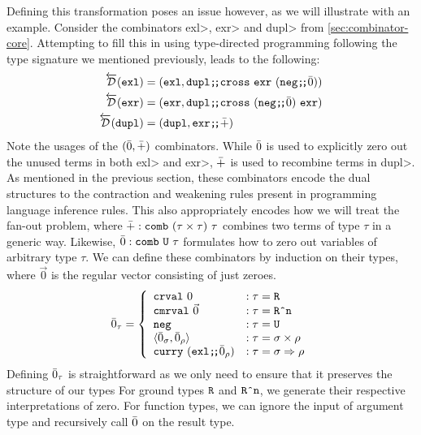   Defining this transformation poses an issue however, as we will illustrate with an example.
  Consider the combinators \<exl>, \<exr> and \<dupl> from \cref{sec:combinator-core}.
  Attempting to fill this in using type-directed programming following the type signature we mentioned previously, leads to the following:
  \begin{align*}
    \overleftarrow{\mathcal{D}}(\texttt{exl}) &= (\texttt{exl}, \texttt{dupl} \texttt{;\!;} \texttt{cross}\ \texttt{exr}\ (\texttt{neg} \texttt{;\!;} \bar{0})) \\
    \overleftarrow{\mathcal{D}}(\texttt{exr}) &= (\texttt{exr}, \texttt{dupl} \texttt{;\!;} \texttt{cross}\ (\texttt{neg} \texttt{;\!;} \bar{0})\ \texttt{exr}) \\
    \overleftarrow{\mathcal{D}}(\texttt{dupl}) &= (\texttt{dupl}, \texttt{exr} \texttt{;\!;} \bar{+})
  \end{align*}
  Note the usages of the $(\bar{0}, \bar{+})$ combinators.
  While $\bar{0}$ is used to explicitly zero out the unused terms in both \<exl> and \<exr>, $\bar{+}$ is used to recombine terms in \<dupl>.
  As mentioned in the previous section, these combinators encode the dual structures to the contraction and weakening rules present in programming language inference rules.
  This also appropriately encodes how we will treat the fan-out problem, where $\bar{+} : \texttt{comb}\ (\tau \times \tau)\ \tau$ combines two terms of type $\tau$ in a generic way.
  Likewise, $\bar{0} : \texttt{comb}\ \texttt{U}\ \tau$ formulates how to zero out variables of arbitrary type $\tau$.
  We can define these combinators by induction on their types, where $\vec{0}$ is the regular vector consisting of just zeroes.
  \begin{align*}
    \bar{0}_\tau =
      \left\{
        \begin{array}{ll}
          \texttt{crval}\ 0 & : \tau = \texttt{R} \\
          \texttt{cmrval}\ \vec{0} & : \tau = \texttt{R\^{}n} \\
          \texttt{neg} & : \tau = \texttt{U} \\
          \langle \bar{0}_\sigma, \bar{0}_\rho \rangle & : \tau = \sigma \times \rho \\
          \texttt{curry}\ (\texttt{exl} \texttt{;\!;} \bar{0}_\rho) & : \tau = \sigma \Rightarrow \rho \\
        \end{array}
      \right.
  \end{align*}
  Defining $\bar{0}_\tau$ is straightforward as we only need to ensure that it preserves the structure of our types
  For ground types $\texttt{R}$ and $\texttt{R\^{}n}$, we generate their respective interpretations of zero.
  For function types, we can ignore the input of argument type and recursively call $\bar{0}$ on the result type.
